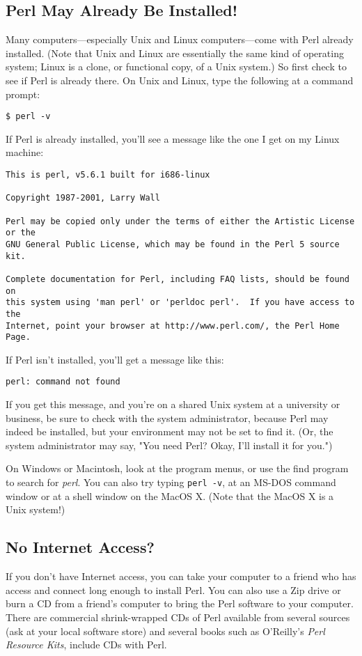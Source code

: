 \subsection{Perl May Already Be Installed!}
Many computers—especially Unix and Linux computers—come with Perl already installed. (Note that Unix and Linux are essentially the same kind of operating system; Linux is a clone, or functional copy, of a Unix system.) So first check to see if Perl is already there. On Unix and Linux, type the following at a command prompt:

\verb|$ perl -v|

If Perl is already installed, you'll see a message like the one I get on my Linux machine:

\begin{verbatim}
This is perl, v5.6.1 built for i686-linux

Copyright 1987-2001, Larry Wall

Perl may be copied only under the terms of either the Artistic License or the
GNU General Public License, which may be found in the Perl 5 source kit.

Complete documentation for Perl, including FAQ lists, should be found on
this system using 'man perl' or 'perldoc perl'.  If you have access to the
Internet, point your browser at http://www.perl.com/, the Perl Home Page.
\end{verbatim}

If Perl isn't installed, you'll get a message like this:

\begin{verbatim}
perl: command not found
\end{verbatim}

If you get this message, and you're on a shared Unix system at a university or business, be sure to check with the system administrator, because Perl may indeed be installed, but your environment may not be set to find it. (Or, the system administrator may say, "You need Perl? Okay, I'll install it for you.")

On Windows or Macintosh, look at the program menus, or use the find
program to search for \textit{perl}. You can also try typing \verb|perl -v|, at an MS-DOS command window or at a shell window on the MacOS X. (Note that the MacOS X is a Unix system!)

\subsection{No Internet Access?}
If you don't have Internet access, you can take your computer to a friend who has access and connect long enough to install Perl. You can also use a Zip drive or burn a CD from a friend's computer to bring the Perl software to your computer. There are commercial shrink-wrapped CDs of Perl available from several sources (ask at your local software store) and several books such as O'Reilly's \textit{Perl Resource Kits}, include CDs with Perl.

